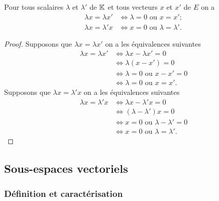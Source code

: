 \begin{prop}
  Pour tous scalaires $\lambda$ et $\lambda'$ de $\mathbb{K}$ et tous vecteurs $x$ et $x'$ de $E$ on a
  \begin{align}
    \lambda x = \lambda x' &\iff \lambda=0 \text{~ou~} x=x'; \\
    \lambda x = \lambda' x &\iff x=0 \text{~ou~} \lambda=\lambda'.
  \end{align}
\end{prop}
\begin{proof}
  Supposons que $\lambda x=\lambda x'$ on a les équivalences suivantes
  \begin{align}
    \lambda x=\lambda x' &\iff \lambda x-\lambda x' = 0\\
    &\iff \lambda(x-x')=0\\
    &\iff \lambda = 0 \text{~ou~} x-x'=0\\
    &\iff \lambda = 0 \text{~ou~} x=x'.
  \end{align}
  Supposons que $\lambda x=\lambda' x$ on a les équivalences suivantes
  \begin{align}
    \lambda x=\lambda' x &\iff \lambda x-\lambda' x= 0\\
    &\iff (\lambda-\lambda')x=0\\
    &\iff x = 0 \text{~ou~} \lambda-\lambda'=0\\
    &\iff x = 0 \text{~ou~} \lambda=\lambda'.
  \end{align}
\end{proof}

\subsection{Sous-espaces vectoriels}

\subsubsection{Définition et caractérisation}


